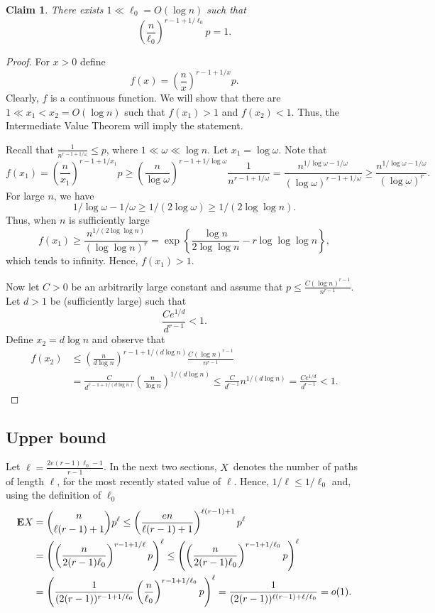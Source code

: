 \documentclass[12pt,reqno]{amsart}
\newtheorem{claim}[theorem]{Claim}
\theoremstyle{remark}
\def\E{\mbox{{\bf E}}}
\def\E{\mbox{{\bf E}}}
\begin{document}
\begin{claim}
There exists $1\ll \ell_0 = O(\log n)$ such that 
\[
\left(\frac{n}{\ell_0}\right)^{r-1+1/\ell_0} p =1.
\] 
\end{claim}
\begin{proof}
For $x>0$ define
\[
f(x) = \left(\frac{n}{x}\right)^{r-1+1/x} p.
\]
Clearly, $f$ is a continuous function. We will show that there are $1\ll x_1 < x_2 = O(\log n)$ such that $f(x_1)>1$ and $f(x_2)<1$. Thus,  the Intermediate Value Theorem will imply the statement.

Recall that $\frac{1}{n^{r-1+1/\omega}} \le p$, where $1\ll \omega \ll \log n$. Let $x_1=\log \omega$. Note that
\[
f(x_1) = \left(\frac{n}{x_1}\right)^{r-1+1/x_1} p
\ge \left(\frac{n}{\log \omega}\right)^{r-1+1/\log \omega} \frac{1}{n^{r-1+1/\omega}}
= \frac{n^{1/\log \omega - 1/\omega}}{(\log \omega)^{r-1+1/\omega}}
\ge \frac{n^{1/\log \omega - 1/\omega}}{(\log \omega)^{r}}.
\]
For large $n$, we have 
\[
1/\log \omega - 1/\omega \ge 1/(2\log \omega) \ge 1/(2\log \log n).
\]
Thus, when $n$ is sufficiently large
\[
f(x_1) \ge \frac{n^{1/(2\log \log n)}}{(\log \log n)^{r}}
= \exp\left\{ \frac{\log n}{2\log \log n} - r\log \log \log n \right\},
\]
which tends to infinity. Hence, $f(x_1) > 1$.

Now let $C>0$ be an arbitrarily large constant and assume that $p\le \frac{C(\log n)^{r-1}}{n^{r-1}}$. Let $d>1$ be (sufficiently large) such that 
\[
\frac{Ce^{1/d}}{d^{r-1}}   < 1.
\]
Define $x_2 = d \log n$ and observe that
\begin{align*}
f(x_2) &\le \left(\frac{n}{d\log n}\right)^{r-1+1/(d\log n)} \frac{C(\log n)^{r-1}}{n^{r-1}}\\
&= \frac{C}{d^{r-1+1/(d\log n)}} \left(\frac{n}{\log n}\right)^{1/(d\log n)} 
\le \frac{C}{d^{r-1}} n^{1/(d\log n)} = \frac{Ce^{1/d}}{d^{r-1}}   < 1.
\end{align*}
\end{proof}

\subsection{Upper bound}
Let $\ell =  \frac{2e(r-1)\ell_0-1}{r-1}$. In the next two sections, $X$~denotes the number of paths of length $\ell$, for the most recently stated value of $\ell$. Hence, $1/\ell \le 1/\ell_0$ and, using the definition of $\ell_{0}$
\begin{align*}
\E X &= \binom{n}{\ell(r-1)+1}p^\ell
\le \left(\frac{en}{\ell(r-1)+1}\right)^{\ell(r-1)+1}p^\ell\\
&= \left(\left(\frac{n}{2(r-1)\ell_0}\right)^{r-1+1/\ell}p\right)^\ell
\le \left(\left(\frac{n}{2(r-1)\ell_0}\right)^{r-1+1/\ell_0}p\right)^\ell\\
&= \left(\frac{1}{(2(r-1))^{r-1+1/\ell_0}} \left(\frac{n}{\ell_0}\right)^{r-1+1/\ell_0}p\right)^\ell
= \frac{1}{(2(r-1))^{\ell(r-1)+\ell/\ell_0}} = o(1).
\end{align*}
\end{document}
